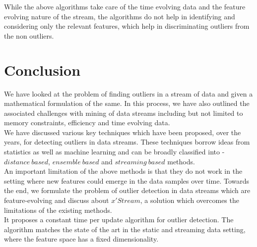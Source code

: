 While the above algorithms take care of the time evolving data and the feature evolving nature of the stream, the algorithms do not help in identifying and considering only the relevant features, which help in discriminating outliers from the non outliers. 

\section{Conclusion}

We have looked at the problem of finding outliers in a stream of data and given a mathematical formulation of the same. In this process, we have also outlined the associated challenges with mining of data streams including but not limited to memory constraints, efficiency and time evolving data. \\

We have discussed various key techniques which have been proposed, over the years, for detecting outliers in data streams. These techniques borrow ideas from statistics as well as machine learning and can be broadly classified into - $distance\ based$, $ensemble\ based$ and $streaming\ based$ methods. \\

An important limitation of the above methods is that they do not work in the setting where new features could emerge in the data samples over time. Towards the end, we formulate the problem of outlier detection in data streams which are feature-evolving and discuss about $x'Stream$, a solution which overcomes the limitations of the existing methods. \\

It proposes a constant time per update algorithm for outlier detection. The algorithm matches the state of the art in the static and streaming data setting, where the feature space has a fixed dimensionality.


